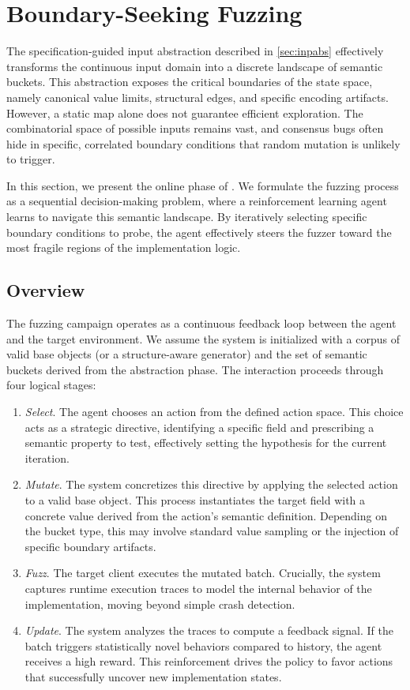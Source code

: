 \section{Boundary-Seeking Fuzzing}\label{sec:fuzzing}

The specification-guided input abstraction described in \autoref{sec:inpabs} effectively transforms the continuous input domain into a discrete landscape of semantic buckets. This abstraction exposes the critical boundaries of the state space, namely canonical value limits, structural edges, and specific encoding artifacts. However, a static map alone does not guarantee efficient exploration. The combinatorial space of possible inputs remains vast, and consensus bugs often hide in specific, correlated boundary conditions that random mutation is unlikely to trigger.

In this section, we present the online phase of \tool. We formulate the fuzzing process as a sequential decision-making problem, where a reinforcement learning agent learns to navigate this semantic landscape. By iteratively selecting specific boundary conditions to probe, the agent effectively steers the fuzzer toward the most fragile regions of the implementation logic.

\subsection{Overview}
\label{sec:fuzzing_overview}

The fuzzing campaign operates as a continuous feedback loop between the agent and the target environment. We assume the system is initialized with a corpus of valid base objects (or a structure-aware generator) and the set of semantic buckets derived from the abstraction phase. The interaction proceeds through four logical stages:

\begin{enumerate}
    \item \emph{Select}. The agent chooses an action from the defined action space. This choice acts as a strategic directive, identifying a specific field and prescribing a semantic property to test, effectively setting the hypothesis for the current iteration.
    \item \emph{Mutate}. The system concretizes this directive by applying the selected action to a valid base object. This process instantiates the target field with a concrete value derived from the action's semantic definition. Depending on the bucket type, this may involve standard value sampling or the injection of specific boundary artifacts.
    \item \emph{Fuzz}. The target client executes the mutated batch. Crucially, the system captures runtime execution traces to model the internal behavior of the implementation, moving beyond simple crash detection.
    \item \emph{Update}. The system analyzes the traces to compute a feedback signal. If the batch triggers statistically novel behaviors compared to history, the agent receives a high reward. This reinforcement drives the policy to favor actions that successfully uncover new implementation states.
\end{enumerate}

